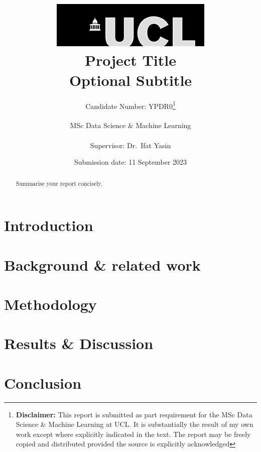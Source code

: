 \documentclass[12pt]{report}
\title{  	{ \includegraphics[scale=.5]{ucl_logo.png}}\\
{{\Huge Project Title}}\\
{\large Optional Subtitle}\\}
\date{Submission date: 11 September 2023}
\author{Candidate Number: YPDR0\thanks{
{\bf Disclaimer:}
This report is submitted as part requirement for the MSc Data Science \& Machine
Learning at UCL. It is substantially the result of my own work except where
explicitly indicated in the text. The report may be freely copied and
distributed provided the source is explicitly acknowledged
}
\\ \\
MSc Data Science \& Machine Learning\\ \\
Supervisor: Dr.\ Ifat Yasin}
\begin{document}
 
 \onehalfspacing
\maketitle
\begin{abstract}
Summarise your report concisely.
\end{abstract}
\tableofcontents
\setcounter{page}{1}


\chapter{Introduction}\label{cp:intro}


\chapter{Background \& related work}


\chapter{Methodology}


\chapter{Results \& Discussion}


\chapter{Conclusion}


\appendix



\end{document}
